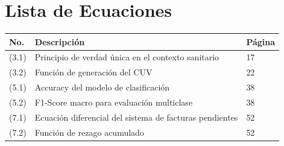 \documentclass[12pt,letterpaper]{report}
\begin{document}
\tableofcontents
\clearpage

\listoftables
\clearpage

\listoffigures
\clearpage

\chapter*{Lista de Ecuaciones}
\begin{tabular}{@{}p{1cm}p{10cm}p{2cm}@{}}
\toprule
\textbf{No.} & \textbf{Descripción} & \textbf{Página} \\
\midrule
(3.1) & Principio de verdad única en el contexto sanitario & 17 \\
(3.2) & Función de generación del CUV & 22 \\
(5.1) & Accuracy del modelo de clasificación & 38 \\
(5.2) & F1-Score macro para evaluación multiclase & 38 \\
(7.1) & Ecuación diferencial del sistema de facturas pendientes & 52 \\
(7.2) & Función de rezago acumulado & 52 \\
\bottomrule
\end{tabular}

\clearpage
\end{document}
